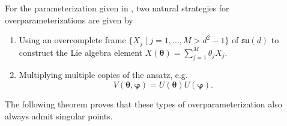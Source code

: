 \documentclass{article}
\renewcommand{\vec}[1]{\ensuremath{\boldsymbol{#1}}}
\begin{document}
For the parameterization given in , two natural strategies for overparameterizations are given by
\begin{enumerate}
    \item Using an overcomplete frame \(\{X_j \mid j = 1,...,M > d^2-1\}\) of \(\mathfrak{su}(d)\) to construct the Lie algebra element \(X(\vec{\theta}) = \sum_{j=1}^M\theta_j X_j\).
    \item Multiplying multiple copies of the ansatz, e.g.
    \begin{equation}
        V(\vec{\theta}, \vec{\varphi}) = U(\vec{\theta}) U(\vec{\varphi}).
    \end{equation}
\end{enumerate}
The following theorem proves that these types of overparameterization also always admit singular points.
\end{document}

